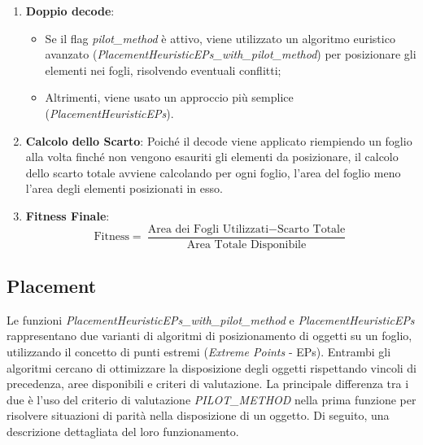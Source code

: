 \begin{enumerate}
    \item \textbf{Doppio decode}:
    \begin{itemize}
        \item Se il flag \emph{pilot\_method} è attivo, viene utilizzato un algoritmo euristico avanzato (\emph{PlacementHeuristicEPs\_with\_pilot\_method}) per posizionare gli elementi nei fogli, risolvendo eventuali conflitti;
        \item Altrimenti, viene usato un approccio più semplice (\emph{PlacementHeuristicEPs}).
    \end{itemize}
    \item \textbf{Calcolo dello Scarto}:
    Poiché il decode viene applicato riempiendo un foglio alla volta finché non vengono esauriti gli elementi da posizionare, il calcolo dello scarto totale avviene calcolando per ogni foglio, l'area del foglio meno l'area degli elementi posizionati in esso.
    \item \textbf{Fitness Finale}:
    \[
    \text{Fitness} = \frac{\text{Area dei Fogli Utilizzati} - \text{Scarto Totale}}{\text{Area Totale Disponibile}}
    \]
\end{enumerate}

\subsection{Placement}

Le funzioni \emph{PlacementHeuristicEPs\_with\_pilot\_method} e \emph{PlacementHeuristicEPs} rappresentano due varianti di algoritmi di posizionamento di oggetti su un foglio, utilizzando il concetto di punti estremi (\emph{Extreme Points} - EPs). Entrambi gli algoritmi cercano di ottimizzare la disposizione degli oggetti rispettando vincoli di precedenza, aree disponibili e criteri di valutazione. La principale differenza tra i due è l'uso del criterio di valutazione \emph{PILOT\_METHOD} nella prima funzione per risolvere situazioni di parità nella disposizione di un oggetto. Di seguito, una descrizione dettagliata del loro funzionamento.

